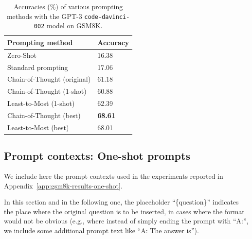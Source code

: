 \begin{table}[h!]
\centering
\begin{tabular}{ |l|l|}
\hline
\textbf{Prompting method} & \textbf{Accuracy}  \\
  \hline
Zero-Shot & 16.38 \\
\hline
Standard prompting & 17.06\footnotemark{} \\
\hline
Chain-of-Thought (original) & 61.18 \\
\hline
Chain-of-Thought (1-shot) & 60.88 \\
\hline
Least-to-Most (1-shot) & 62.39 \\
\hline
Chain-of-Thought (best) & \textbf{68.61}\footnotemark[\value{footnote}] \\
\hline
Least-to-Most (best) & 68.01 \\
\hline\end{tabular}
\vspace{5pt}
\caption{Accuracies (\%) of various prompting methods with the GPT-3 \texttt{code-davinci-002} model on GSM8K.}
\label{table: gsm8k-results}
\end{table}


\subsection{Prompt contexts: One-shot prompts}
\label{app:gsm8k-prompts-one-shot}

We include here the prompt contexts used in the experiments reported in Appendix~\ref{app:gsm8k-results-one-shot}.

In this section and in the following one, the placeholder ``\{question\}'' indicates the place where the original question is to be inserted, in cases where the format would not be obvious (e.g., where instead of simply ending the prompt with ``A:'', we include some additional prompt text like ``A: The answer is'').

